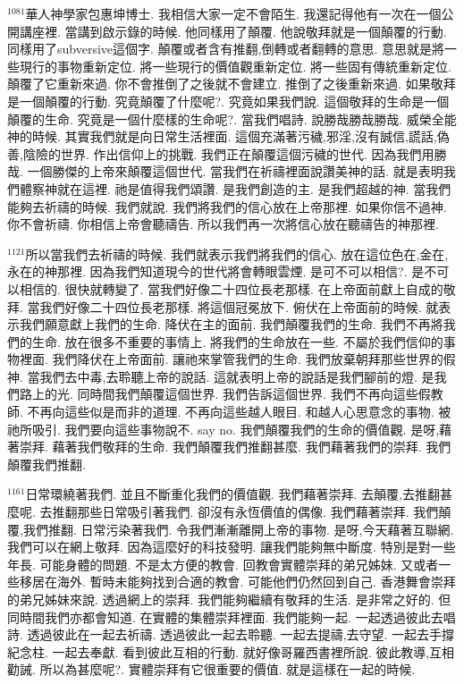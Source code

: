 \documentclass{book}
\begin{document}
$^{1081}$華人神學家包惠坤博士.
我相信大家一定不會陌生.
我還記得他有一次在一個公開講座裡.
當講到啟示錄的時候.
他同樣用了顛覆.
他說敬拜就是一個顛覆的行動.
同樣用了subversive這個字.
顛覆或者含有推翻,倒轉或者翻轉的意思.
意思就是將一些現行的事物重新定位.
將一些現行的價值觀重新定位.
將一些固有傳統重新定位.
顛覆了它重新來過.
你不會推倒了之後就不會建立.
推倒了之後重新來過.
如果敬拜是一個顛覆的行動.
究竟顛覆了什麼呢?.
究竟如果我們說.
這個敬拜的生命是一個顛覆的生命.
究竟是一個什麼樣的生命呢?.
當我們唱詩.
說勝哉勝哉勝哉.
威榮全能神的時候.
其實我們就是向日常生活裡面.
這個充滿著污穢,邪淫,沒有誠信,謊話,偽善,陰險的世界.
作出信仰上的挑戰.
我們正在顛覆這個污穢的世代.
因為我們用勝哉.
一個勝傑的上帝來顛覆這個世代.
當我們在祈禱裡面說讚美神的話.
就是表明我們體察神就在這裡.
祂是值得我們頌讚.
是我們創造的主.
是我們超越的神.
當我們能夠去祈禱的時候.
我們就說.
我們將我們的信心放在上帝那裡.
如果你信不過神.
你不會祈禱.
你相信上帝會聽禱告.
所以我們再一次將信心放在聽禱告的神那裡.

$^{1121}$所以當我們去祈禱的時候.
我們就表示我們將我們的信心.
放在這位色在,金在,永在的神那裡.
因為我們知道現今的世代將會轉眼雲煙.
是可不可以相信?.
是不可以相信的.
很快就轉變了.
當我們好像二十四位長老那樣.
在上帝面前獻上自成的敬拜.
當我們好像二十四位長老那樣.
將這個冠冕放下.
俯伏在上帝面前的時候.
就表示我們願意獻上我們的生命.
降伏在主的面前.
我們顛覆我們的生命.
我們不再將我們的生命.
放在很多不重要的事情上.
將我們的生命放在一些.
不屬於我們信仰的事物裡面.
我們降伏在上帝面前.
讓祂來掌管我們的生命.
我們放棄朝拜那些世界的假神.
當我們去中毒,去聆聽上帝的說話.
這就表明上帝的說話是我們腳前的燈.
是我們路上的光.
同時間我們顛覆這個世界.
我們告訴這個世界.
我們不再向這些假教師.
不再向這些似是而非的道理.
不再向這些越人眼目.
和越人心思意念的事物.
被祂所吸引.
我們要向這些事物說不.
say no.
我們顛覆我們的生命的價值觀.
是呀,藉著崇拜.
藉著我們敬拜的生命.
我們顛覆我們推翻甚麼.
我們藉著我們的崇拜.
我們顛覆我們推翻.

$^{1161}$日常環繞著我們.
並且不斷重化我們的價值觀.
我們藉著崇拜.
去顛覆,去推翻甚麼呢.
去推翻那些日常吸引著我們.
卻沒有永恆價值的偶像.
我們藉著崇拜.
我們顛覆,我們推翻.
日常污染著我們.
令我們漸漸離開上帝的事物.
是呀,今天藉著互聯網.
我們可以在網上敬拜.
因為這麼好的科技發明.
讓我們能夠無中斷度.
特別是對一些年長.
可能身體的問題.
不是太方便的教會.
回教會實體崇拜的弟兄姊妹.
又或者一些移居在海外.
暫時未能夠找到合適的教會.
可能他們仍然回到自己.
香港舞會崇拜的弟兄姊妹來說.
透過網上的崇拜.
我們能夠繼續有敬拜的生活.
是非常之好的.
但同時間我們亦都會知道.
在實體的集體崇拜裡面.
我們能夠一起.
一起透過彼此去唱詩.
透過彼此在一起去祈禱.
透過彼此一起去聆聽.
一起去提禱,去守望.
一起去手撐紀念柱.
一起去奉獻.
看到彼此互相的行動.
就好像哥羅西書裡所說.
彼此教導,互相勸誡.
所以為甚麼呢?.
實體崇拜有它很重要的價值.
就是這樣在一起的時候.
\end{document}
